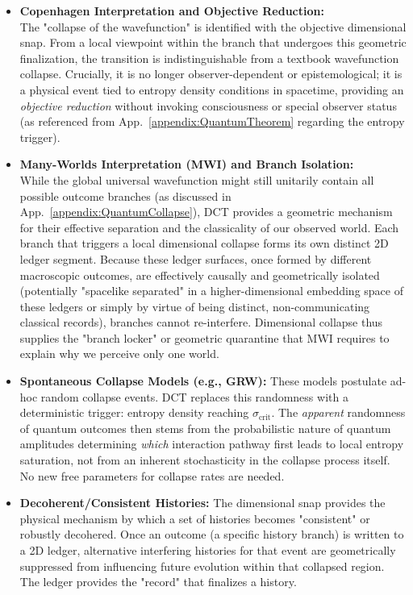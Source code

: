 \documentclass[a4paper, 12pt, oneside]{book}
\numberwithin{equation}{chapter}
\begin{document}
\begin{itemize}
    \item \textbf{Copenhagen Interpretation and Objective Reduction:}
        \\ The "collapse of the wavefunction" is identified with the objective dimensional snap. From a local viewpoint within the branch that undergoes this geometric finalization, the transition is indistinguishable from a textbook wavefunction collapse. Crucially, it is no longer observer-dependent or epistemological; it is a physical event tied to entropy density conditions in spacetime, providing an \emph{objective reduction} without invoking consciousness or special observer status (as referenced from App.~\ref{appendix:QuantumTheorem} regarding the entropy trigger).
    
    \item \textbf{Many-Worlds Interpretation (MWI) and Branch Isolation:}
        \\ While the global universal wavefunction might still unitarily contain all possible outcome branches (as discussed in App.~\ref{appendix:QuantumCollapse}), DCT provides a geometric mechanism for their effective separation and the classicality of our observed world. Each branch that triggers a local dimensional collapse forms its own distinct 2D ledger segment. Because these ledger surfaces, once formed by different macroscopic outcomes, are effectively causally and geometrically isolated (potentially "spacelike separated" in a higher-dimensional embedding space of these ledgers or simply by virtue of being distinct, non-communicating classical records), branches cannot re-interfere. Dimensional collapse thus supplies the "branch locker" or geometric quarantine that MWI requires to explain why we perceive only one world.

    \item \textbf{Spontaneous Collapse Models (e.g., GRW):}
        These models postulate ad-hoc random collapse events. DCT replaces this randomness with a deterministic trigger: entropy density reaching $\sigma_{\text{crit}}$. The \emph{apparent} randomness of quantum outcomes then stems from the probabilistic nature of quantum amplitudes determining \emph{which} interaction pathway first leads to local entropy saturation, not from an inherent stochasticity in the collapse process itself. No new free parameters for collapse rates are needed.

    \item \textbf{Decoherent/Consistent Histories:}
        The dimensional snap provides the physical mechanism by which a set of histories becomes "consistent" or robustly decohered. Once an outcome (a specific history branch) is written to a 2D ledger, alternative interfering histories for that event are geometrically suppressed from influencing future evolution within that collapsed region. The ledger provides the "record" that finalizes a history.
    

\end{itemize}
\end{document}
